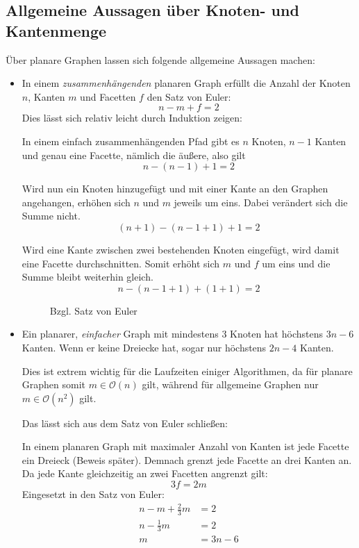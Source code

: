 \documentclass[10pt,a4paper]{article}
\makeatletter
\def\maxwidth#1{\ifdim\Gin@nat@width>#1 #1\else\Gin@nat@width\fi}
\newcommand{\imageFigureMult}[6]{%
    \imageFigureMultS{#1}{#2}{#3}{#4}{#5}{#6}{0.45}%
}
\newcommand{\imageFigureMultS}[7]{%
    \begin{figure}[h]%
        \centering
        \subfloat[#1]{{\texttt{[image: \#2]} }}%
        \qquad
        \subfloat[#3]{{\texttt{[image: \#4]} }}%
        \caption{#5}%
        \label{fig:#6}%
    \end{figure}
}
\makeatother
\begin{document}
\subsection{Allgemeine Aussagen über Knoten- und Kantenmenge}
Über planare Graphen lassen sich folgende allgemeine Aussagen machen:
\begin{itemize}
    \item In einem \textit{zusammenhängenden} planaren Graph erfüllt die Anzahl
        der Knoten $n$, Kanten $m$ und Facetten $f$ den Satz von Euler:
        $$n-m+f=2$$
        Dies lässt sich relativ leicht durch Induktion zeigen:

        In einem einfach zusammenhängenden Pfad gibt es $n$ Knoten, $n-1$
        Kanten und genau eine Facette, nämlich die äußere, also gilt
        $$n-(n-1)+1=2$$

        Wird nun ein Knoten hinzugefügt und mit einer Kante an den Graphen
        angehangen, erhöhen sich $n$ und $m$ jeweils um eins.
        Dabei verändert sich die Summe nicht.
        $$(n+1)-(n-1+1)+1=2$$

        Wird eine Kante zwischen zwei bestehenden Knoten eingefügt, wird damit
        eine Facette durchschnitten.
        Somit erhöht sich $m$ und $f$ um eins und die Summe bleibt weiterhin
        gleich.
        $$n-(n-1+1)+(1+1)=2$$

        \imageFigureMult{$n=4, m=3, f=1$}{line.png}
            {$n=4, m=4, f=2$}{line2.png}
            {Bzgl. Satz von Euler}{eulergraphs}
    \item Ein planarer, \textit{einfacher} Graph mit mindestens 3 Knoten hat
        höchstens $3n-6$ Kanten.
        Wenn er keine Dreiecke hat, sogar nur höchstens $2n-4$ Kanten.

        Dies ist extrem wichtig für die Laufzeiten einiger Algorithmen, da für
        planare Graphen somit $m \in \mathcal{O}(n)$ gilt, während für
        allgemeine Graphen nur $m \in \mathcal{O}(n^2)$ gilt.

        Das lässt sich aus dem Satz von Euler schließen:

        In einem planaren Graph mit maximaler Anzahl von Kanten ist jede
        Facette ein Dreieck (Beweis später).
        Demnach grenzt jede Facette an drei Kanten an.
        Da jede Kante gleichzeitig an zwei Facetten angrenzt gilt:
        $$3f=2m$$
        Eingesetzt in den Satz von Euler:
        \begin{align*}
            n-m+\frac{2}{3}m&=2\\
            n-\frac{1}{3}m&=2\\
            m&=3n-6
        \end{align*}


\end{itemize}
\end{document}
